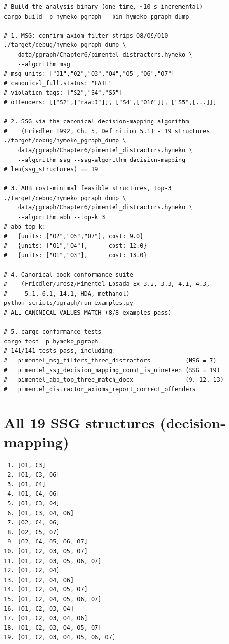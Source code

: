 \documentclass[11pt]{article}
\begin{document}
\begin{lstlisting}
# Build the analysis binary (one-time, ~10 s incremental)
cargo build -p hymeko_pgraph --bin hymeko_pgraph_dump

# 1. MSG: confirm axiom filter strips O8/O9/O10
./target/debug/hymeko_pgraph_dump \
    data/pgraph/Chapter6/pimentel_distractors.hymeko \
    --algorithm msg
# msg_units: ["O1","O2","O3","O4","O5","O6","O7"]
# canonical_full.status: "FAIL"
# violation_tags: ["S2","S4","S5"]
# offenders: [["S2",["raw:J"]], ["S4",["O10"]], ["S5",[...]]]

# 2. SSG via the canonical decision-mapping algorithm
#    (Friedler 1992, Ch. 5, Definition 5.1) - 19 structures
./target/debug/hymeko_pgraph_dump \
    data/pgraph/Chapter6/pimentel_distractors.hymeko \
    --algorithm ssg --ssg-algorithm decision-mapping
# len(ssg_structures) == 19

# 3. ABB cost-minimal feasible structures, top-3
./target/debug/hymeko_pgraph_dump \
    data/pgraph/Chapter6/pimentel_distractors.hymeko \
    --algorithm abb --top-k 3
# abb_top_k:
#   {units: ["O2","O5","O7"], cost: 9.0}
#   {units: ["O1","O4"],      cost: 12.0}
#   {units: ["O1","O3"],      cost: 13.0}

# 4. Canonical book-conformance suite
#    (Friedler/Orosz/Pimentel-Losada Ex 3.2, 3.3, 4.1, 4.3,
#     5.1, 6.1, 14.1, HDA, methanol)
python scripts/pgraph/run_examples.py
# ALL CANONICAL VALUES MATCH (8/8 examples pass)

# 5. cargo conformance tests
cargo test -p hymeko_pgraph
# 141/141 tests pass, including:
#   pimentel_msg_filters_three_distractors          (MSG = 7)
#   pimentel_ssg_decision_mapping_count_is_nineteen (SSG = 19)
#   pimentel_abb_top_three_match_docx               (9, 12, 13)
#   pimentel_distractor_axioms_report_correct_offenders
\end{lstlisting}

\section*{All 19 SSG structures (decision-mapping)}

\begin{lstlisting}
 1. [O1, O3]
 2. [O1, O3, O6]
 3. [O1, O4]
 4. [O1, O4, O6]
 5. [O1, O3, O4]
 6. [O1, O3, O4, O6]
 7. [O2, O4, O6]
 8. [O2, O5, O7]
 9. [O2, O4, O5, O6, O7]
10. [O1, O2, O3, O5, O7]
11. [O1, O2, O3, O5, O6, O7]
12. [O1, O2, O4]
13. [O1, O2, O4, O6]
14. [O1, O2, O4, O5, O7]
15. [O1, O2, O4, O5, O6, O7]
16. [O1, O2, O3, O4]
17. [O1, O2, O3, O4, O6]
18. [O1, O2, O3, O4, O5, O7]
19. [O1, O2, O3, O4, O5, O6, O7]
\end{lstlisting}
\end{document}
